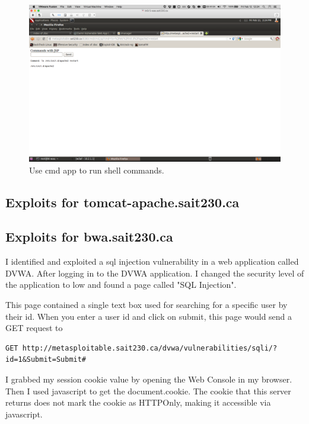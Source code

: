 \documentclass{article}
\begin{document}
\begin{figure}[h!]
	\includegraphics[width=\linewidth]{images/tomcat-metasploitable-cmd.png}
	\caption{Use cmd app to run shell commands.}
	\label{fig:tomcat-injection5}
\end{figure}

\newpage
\subsection{Exploits for tomcat-apache.sait230.ca}


\subsection{Exploits for bwa.sait230.ca}

I identified and exploited a sql injection vulnerability in a web application called DVWA\@.
After logging in to the DVWA application. I changed the security level of the application to low
and found a page called "SQL Injection".

This page contained a single text box used for searching for a specific user by their id.
When you enter a user id and click on submit, this page would send a GET request to 

\begin{lstlisting}
GET http://metasploitable.sait230.ca/dvwa/vulnerabilities/sqli/?id=1&Submit=Submit#
\end{lstlisting}

I grabbed my session cookie value by opening the Web Console in my browser. 
Then I used javascript to get the document.cookie. The cookie that this server
returns does not mark the cookie as HTTPOnly, making it accessible via javascript.
\end{document}

